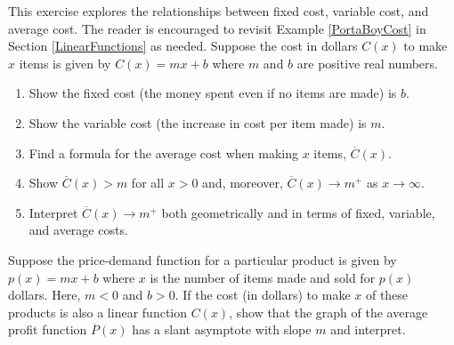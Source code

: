 \documentclass{ximera}
\begin{document}
\begin{problem}\label{averagevariablecostexercise}
This exercise explores the relationships between fixed cost, variable cost, and average cost.  The reader is encouraged to revisit Example \ref{PortaBoyCost} in Section \ref{LinearFunctions} as needed.  Suppose the cost in dollars $C(x)$ to make $x$ items is given by $C(x) = mx + b$ where $m$ and $b$ are positive real numbers.

\begin{enumerate}

\item  Show the fixed cost (the money spent even if no items are made) is $b$.
\item  Show the variable cost (the increase in cost per item made) is $m$.
\item  Find a formula for the average cost when making $x$ items, $\overline{C}(x)$.
\item  Show $\overline{C}(x) > m$ for all $x>0$ and, moreover,   $\overline{C}(x)  \rightarrow m^{+}$ as $x \rightarrow \infty$.
\item  Interpret $\overline{C}(x)  \rightarrow m^{+}$ both geometrically and in terms of fixed, variable, and average costs.

\end{enumerate}
\end{problem}

\begin{problem}\label{slantyintaverageprofitexercise}
Suppose the price-demand function for a particular product is given by $p(x) = mx + b$  where $x$ is the number of items made and sold for $p(x)$ dollars.  Here,  $m<0$ and $b>0$.  If the cost (in dollars) to make $x$ of these products is also a linear  function $C(x)$, show that the graph of the average profit function $\overline{P}(x)$ has a slant asymptote with slope $m$ and interpret.
\end{problem}
\end{document}
